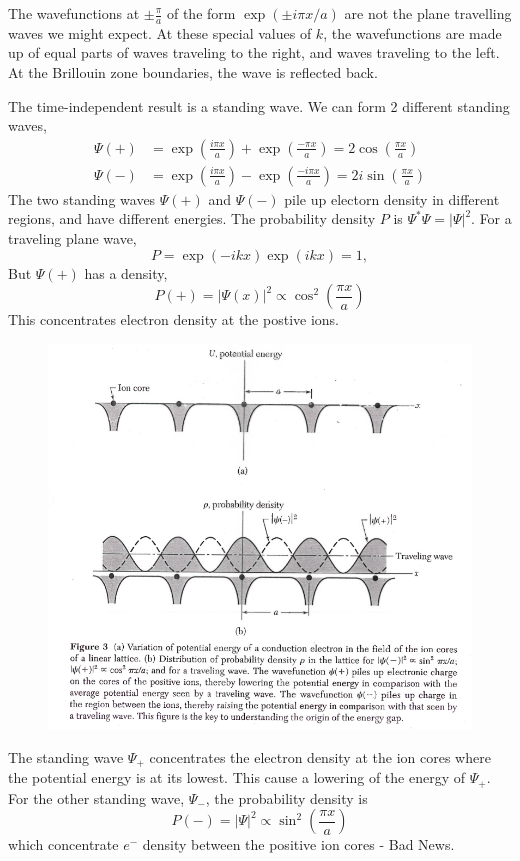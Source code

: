 \documentclass[a4paper, 11pt, normalem]{report}
\begin{document}
The wavefunctions at $\pm \frac{\pi}{a}$ of the form $\exp{(\pm i\pi x/a)}$ are not the plane travelling waves we might expect.
At these special values of $k$, the wavefunctions are made up of equal parts of waves traveling to the right, and waves traveling to the left. 
At the Brillouin zone boundaries, the wave is reflected back. 

The time-independent result is a standing wave.
We can form 2 different standing waves,
\begin{align}
    \Psi(+) &= \exp{\left(\frac{i\pi x}{a}\right)}  + \exp\left(\frac{-\pi x}{a}\right) = 2\cos\left(\frac{\pi x}{a}\right) \\
    \Psi(-) &= \exp\left(\frac{i\pi x}{a}\right) - \exp\left(\frac{-i\pi x}{a}\right) = 2i\sin\left(\frac{\pi x}{a}\right) 
\end{align}
The two standing waves $\Psi(+)$ and $\Psi(-)$ pile up electorn density in different regions, and have different energies. 
The probability density $P$ is $\Psi^*\Psi = |\Psi|^2$.
For a traveling plane wave, 
\begin{equation}
    P = \exp(-ikx)\exp(ikx) = 1,
\end{equation}
But $\Psi(+)$ has a density, 
\begin{equation}
    P(+) = |\Psi(x)|^2 \propto \cos^2\left(\frac{\pi x}{a}\right)
\end{equation}
This concentrates electron density at the postive ions. 
\begin{figure}[H]
    \centering
    \includegraphics[scale=0.5]{l2f3.png}
\end{figure}
The standing wave $\Psi_+$ concentrates the electron density at the ion cores where the potential energy is at its lowest. 
This cause a lowering of the energy of $\Psi_+$.
For the other standing wave, $\Psi_-$, the probability density is
\begin{equation}
    P(-) = |\Psi|^2 \propto \sin^2\left(\frac{\pi x}{a}\right)
\end{equation}
which concentrate $e^-$ density between the positive ion cores - Bad News. 
\end{document}
